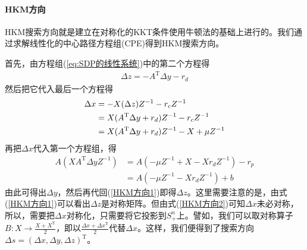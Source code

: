        \paragraph{HKM方向}
        HKM搜索方向就是建立在对称化的KKT条件使用牛顿法的基础上进行的。我们通过求解线性化的中心路径方程组(CPE)得到HKM搜索方向。
        \par
        首先，由方程组(\ref{eq:SDP的线性系统})中的第二个方程得
        \begin{align}
        \label{HKM方向1}
        \Delta z=-A^\mathrm{T} \Delta y-r_d
        \end{align}
        然后把它代入最后一个方程得
        \begin{align}
        \label{HKM方向2}
        \Delta x& =-X(\Delta z)Z^{-1}-r_cZ^{-1}\notag \\
        & =X(A^\mathrm{T} \Delta y+r_d)Z^{-1}-r_cZ^{-1} \notag \\
        & =X(A^\mathrm{T} \Delta y+r_d)Z^{-1}-X+\mu Z^{-1}
        \end{align}
        再把$\Delta x$代入第一个方程组，得
        \begin{equation}
        \label{HKM方向3}
        \begin{split}
        A(XA^\mathrm{T} \Delta yZ^{-1})& =A(-\mu Z^{-1}+X-Xr_dZ^{-1})-r_p \\
        & =A(-\mu Z^{-1}-Xr_dZ^{-1})+b
        \end{split}
        \end{equation}
        由此可得出$\Delta y$，然后再代回(\ref{HKM方向1})即得$\Delta z$。这里需要注意的是，由式(\ref{HKM方向1})可以看出$\Delta z$是对称矩阵。但由式(\ref{HKM方向2})可知$\Delta x$未必对称，所以，需要把$\Delta x$对称化，只需要将它投影到$S_{+}^n$上。譬如，我们可以取对称算子$B:X\to \frac {X+X^\mathrm{T} }{2}$，即以$\frac{\Delta x+\Delta x^\mathrm{T} }{2}$代替$\Delta x$。这样，我们便得到了搜索方向$\Delta s=(\Delta x,\Delta y,\Delta z)^\mathrm{T} $。
